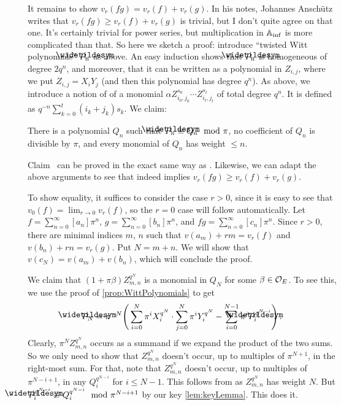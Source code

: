 \begin{proof*}
	It remains to show $v_r(fg)=v_r(f)+v_r(g)$. In his notes, Johannes Anschütz writes that $v_r(fg)\geq v_r(f)+v_r(g)$ is trivial, but I don't quite agree on that one. It's certainly trivial for power series, but multiplication in $\mathbb{A}_{\mathrm{inf}}$ is more complicated than that. So here we sketch a proof: introduce \enquote{twisted Witt polynomials} $\snake{P}_n$ as above. An easy induction shows that $\snake{P}_n$ is homogeneous of degree $2q^n$, and moreover, that it can be written as a polynomial in $Z_{i,j}$, where we put $Z_{i,j}=X_iY_j$ (and then this polynomial has degree $q^n$). As above, we introduce a notion of  of a monomial $\alpha Z_{i_0,j_0}^{s_0}\dotsm Z_{i_t,j_t}^{s_t}$ of total degree $q^n$. It is defined as $q^{-n}\sum_{k=0}^t(i_k+j_k)s_k$. We claim:
	\begin{alphanumerate}
		\item[\itememph{\boxtimes}] There is a polynomial $Q_n$ such that $\snake{P}_n\equiv Q_n\mod \pi$, no coefficient of $Q_n$ is divisible by $\pi$, and every monomial of $Q_n$ has weight $\leq n$.
	\end{alphanumerate}
	Claim~\itememph{\boxtimes} can be proved in the exact same way as \itememph{*}. Likewise, we can adapt the above arguments to see that \itememph{\boxtimes} indeed implies $v_r(fg)\geq v_r(f)+v_r(g)$.
	
	To show equality, it suffices to consider the case $r>0$, since it is easy to see that $v_0(f)=\lim_{r\to 0}v_r(f)$, so the $r=0$ case will follow automatically. Let $f=\sum_{n=0}^\infty [a_n]\pi^n$, $g=\sum_{n=0}^\infty [b_n]\pi^n$, and $fg=\sum_{n=0}^\infty[c_n]\pi^n$. Since $r>0$, there are minimal indices $m$, $n$ such that $v(a_m)+rm=v_r(f)$ and $v(b_n)+rn=v_r(g)$. Put $N=m+n$. We will show that $v(c_N)=v(a_m)+v(b_n)$, which will conclude the proof. 
	
	We claim that $(1+\pi \beta)Z_{m,n}^{q^N}$ is a monomial in $Q_N$ for some $\beta\in\mathcal{O}_E$. To see this, we use the proof of \cref{prop:WittPolynomials} to get
	\begin{equation*}
		\snake{P}_N=\pi^{-N}\Bigg(\sum_{i=0}^N\pi^iX_i^{q^N}\cdot \sum_{j=0}^N\pi^iY_i^{q^N}-\sum_{i=0}^{N-1}\pi^i\snake{P}_i^{q^{N-i}}\Bigg)\,.
	\end{equation*}
	Clearly, $\pi^NZ_{m,n}^{q^N}$ occurs as a summand if we expand the product of the two sums. So we only need to show that $Z_{m,n}^{q^N}$ doesn't occur, up to multiples of $\pi^{N+1}$, in the right-most sum. For that, note that $Z_{m,n}^{q^N}$ doesn't occur, up to multiples of $\pi^{N-i+1}$, in any $Q_i^{q^{N-i}}$ for $i\leq N-1$. This follows from \itememph{\boxtimes} as $Z_{m,n}^{q^N}$ has weight $N$. But $\snake{P}_i^{q^{N-i}}\equiv Q_i^{q^{N-i}}\mod \pi^{N-i+1}$ by our key \cref{lem:keyLemma}. This does it.
	

\end{proof*}
